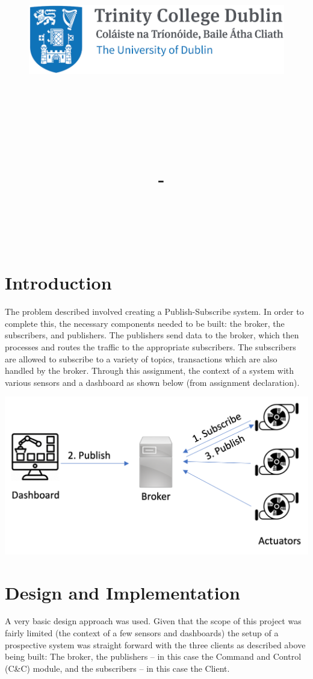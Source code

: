 \documentclass{article}
\title{
    \vspace{-1in}
    \begin{figure}[!ht]
    \flushleft
    \includegraphics[width=0.4\linewidth]{reduced-trinity.png}
    \end{figure}
    \vspace{-0.5cm}
    \hrulefill \\
    \vspace{1cm}
    \textmd{\textbf{\moduleCode\ \moduleName}}\\
    \textmd{\textbf{\assignmentTitle}}\\
    \textmd{\authorName\ - \authorID}\\
    \textmd{\reportDate}\\
    \vspace{0.5cm}
    \hrulefill \\
}
\date{}
\author{}
\begin{document}
    \lstset{language=bash, float=h, captionpos=b, frame=single, numbers=left, numberblanklines=false, numberstyle=\tiny, numbersep=1mm, framexleftmargin=3mm, xleftmargin=5mm, aboveskip=3mm, breaklines=true}
    \captionsetup{width=.8\linewidth} 
    
    \maketitle
    \tableofcontents
    \newpage
    
    \section{Introduction}
    \label{sec:Intro}
    The problem described involved creating a Publish-Subscribe system. In order to complete this, the necessary components needed to be built: the broker, the subscribers, and publishers. The publishers send data to the broker, which then processes and routes the traffic to the appropriate subscribers. The subscribers are allowed to subscribe to a variety of topics, transactions which are also handled by the broker. Through this assignment, the context of a system with various sensors and a dashboard as shown below (from assignment declaration).
    \vspace{0.5cm}
    \begin{center}
        \includegraphics[]{Publish-Instruction-to-Actuators.png}
    \end{center}
    
    \section{Design and Implementation}
    \label{sec:Design}
    A very basic design approach was used. Given that the scope of this project was fairly limited (the context of a few sensors and dashboards) the setup of a prospective system was straight forward with the three clients as described above being built: The broker, the publishers -- in this case the Command and Control (C\&C) module, and the subscribers -- in this case the Client.
    
\end{document}
